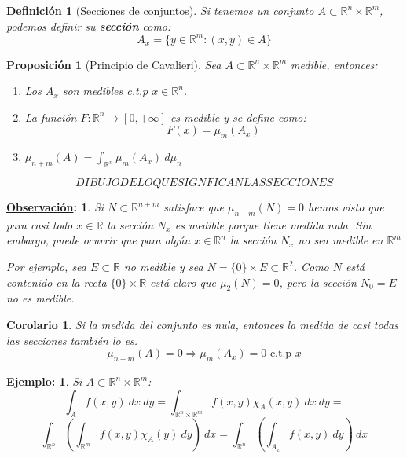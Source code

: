 \documentclass[10pt,a4paper,openright]{book}
\theoremstyle{break}
\newtheorem*{defi}{Definición}
\newtheorem*{coro}{Corolario}
\newtheorem*{prop}{Proposición}
\newtheorem*{obs}{\underline{Observación}:}
\newtheorem*{ej}{\underline{Ejemplo}:}
\newcommand{\dif}[1]{\ d#1}
\begin{document}
\begin{defi}[Secciones de conjuntos]
Si tenemos un conjunto $A \subset \mathbb{R}^n \times \mathbb{R}^m$, podemos definir su \textbf{sección} como:
$$A_x = \{y \in \mathbb{R}^m: \left(x, y\right) \in A\}$$
\end{defi}
\begin{prop}[Principio de Cavalieri]
Sea $A \subset \mathbb{R}^n \times \mathbb{R}^m$ medible, entonces: 
\begin{enumerate}
    \item Los $A_x$ son medibles c.t.p $x\in \mathbb{R}^n$.
    \item La función $F: \mathbb{R}^n \rightarrow \left[0, +\infty\right]$ es medible y se define como:
    $$F \left(x\right) = \mu_m \left(A_x\right)$$
    \item $\mu_{n+m} \left(A\right) = \int_{\mathbb{R}^n} \mu_m \left(A_x\right) \dif{\mu_n} $
\end{enumerate}
\end{prop}

$$DIBUJO DE LO QUE SIGNFICAN LAS SECCIONES$$

\begin{obs}
Si $N \subset \mathbb{R}^{n+m}$ satisface que $\mu_{n+m} \left(N \right) = 0$ hemos visto que para casi todo $x \in \mathbb{R}$ la sección $N_x$ es medible porque tiene medida nula. Sin embargo, puede ocurrir que para algún $x \in \mathbb{R}^n$ la sección $N_x$ no sea medible en $\mathbb{R}^m$

Por ejemplo, sea $E \subset \mathbb{R}$ no medible y sea $N = \{0\} \times E \subset \mathbb{R}^2$. Como $N$ está contenido en la recta $\{0\} \times \mathbb{R}$ está claro que $\mu_2 \left(N\right) = 0$, pero la sección $N_0 = E$ no es medible.\\
\end{obs}

\begin{coro}
Si la medida del conjunto es nula, entonces la medida de casi todas las secciones también lo es.
$$\mu_{n + m} \left(A\right) = 0 \Rightarrow \mu_m \left(A_x\right) = 0 \text{ c.t.p } x$$
\end{coro}

\begin{ej} 
Si $A \subset \mathbb{R}^n \times \mathbb{R}^m$:
$$\int_A f \left(x, y\right) \dif{x} \dif{y} = \int_{\mathbb{R}^n \times \mathbb{R}^m} f \left(x, y\right) \chi_A \left(x, y\right) \dif{x}\dif{y} = $$
$$\int_{\mathbb{R}^n} \left(\int_{\mathbb{R}^m} f \left(x, y\right) \chi_A \left(y\right) \dif{y} \right) \dif{x} = \int_{\mathbb{R}^n} \left(\int_{A_x} f \left(x, y\right) \dif{y}\right) \dif{x}$$
\end{ej}
\end{document}
